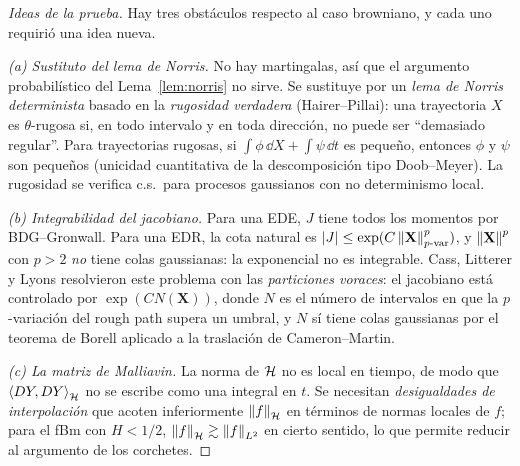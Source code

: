 \begin{proof}[Ideas de la prueba]
Hay tres obstáculos respecto al caso browniano, y cada uno requirió una
idea nueva.

\emph{(a) Sustituto del lema de Norris.} No hay martingalas, así que el argumento probabilístico
del Lema~\ref{lem:norris} no sirve. Se sustituye por un \emph{lema de Norris determinista} basado en la \emph{rugosidad
verdadera} (Hairer--Pillai): una trayectoria $X$ es $\theta$-rugosa si, en todo intervalo y en toda dirección,
no puede ser ``demasiado regular''. Para trayectorias rugosas, si $\int\phi\,\dd X+\int\psi\,\dd t$ es pequeño,
entonces $\phi$ y $\psi$ son pequeños (unicidad cuantitativa de la descomposición tipo Doob--Meyer).
La rugosidad se verifica c.s.\ para procesos gaussianos con no determinismo local.

\emph{(b) Integrabilidad del jacobiano.} Para una EDE, $J$ tiene todos los momentos por BDG--Gronwall.
Para una EDR, la cota natural es $\left\lvert J\right\rvert\le\exp(C\left\lVert \mathbf X\right\rVert^p_{p\text{-var}})$, y $\left\lVert \mathbf X\right\rVert^p$ con $p>2$ \emph{no}
tiene colas gaussianas: la exponencial no es integrable. Cass, Litterer y Lyons resolvieron este
problema con las \emph{particiones voraces}: el jacobiano está controlado por $\exp(CN(\mathbf X))$, donde $N$
es el número de intervalos en que la $p$-variación del rough path supera un umbral, y $N$ sí tiene
colas gaussianas por el teorema de Borell aplicado a la traslación de Cameron--Martin.

\emph{(c) La matriz de Malliavin.} La norma de $\mathcal{H}$ no es local en tiempo, de modo que $\left\langle DY, DY\right\rangle_{\mathcal{H}}$
no se escribe como una integral en $t$. Se necesitan \emph{desigualdades de interpolación} que acoten
inferiormente $\left\lVert f\right\rVert_{\mathcal{H}}$ en términos de normas locales de $f$; para el fBm con $H<1/2$, $\left\lVert f\right\rVert_{\mathcal{H}}\gtrsim\left\lVert f\right\rVert_{L^2}$
en cierto sentido, lo que permite reducir al argumento de los corchetes.
\end{proof}

